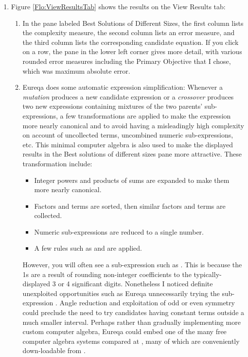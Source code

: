 \documentclass[12pt,english]{article}
\begin{document}
\begin{enumerate}
\begin{enumerate}
\end{enumerate}
\item Figure \ref{Flo:ViewResultsTab} shows the results on the \textsf{View
Results }tab: \vspace{-5pt}


\begin{enumerate}
\item In the pane labeled \textsf{Best Solutions of Different Sizes}, the
first column lists the complexity measure, the second column lists
an error measure, and the third column lists the corresponding candidate
equation. If you click on a row, the pane in the lower left corner
gives more detail, with various rounded error measures including the
\textsf{Primary Objective} that I chose, which was maximum absolute
error.\vspace{-5pt}

\item Eureqa does some automatic expression simplification: Whenever a \textsl{mutation}
produces a new candidate expression or a \textsl{crossover} produces
two new expressions containing mixtures of the two parents' sub-expressions,
a few transformations are applied to make the expression more nearly
canonical and to avoid having a misleadingly high complexity on account
of uncollected terms, uncombined numeric sub-expressions, etc. This
minimal computer algebra is also used to make the displayed results
in the \textsf{Best solutions of different sizes} pane more attractive.
These transformation include:\vspace{-3pt}


\begin{itemize}
\item Integer powers and products of sums are expanded to make them more
nearly canonical.
\item Factors and terms are sorted, then similar factors and terms are collected.
\item Numeric sub-expressions are reduced to a single number.
\item A few rules such as 
and  are applied.
\end{itemize}
However, you will often see a sub-expression such as .
This is because the 1s are a result of rounding non-integer coefficients
to the typically-displayed 3 or 4 significant digits. Nonetheless
I noticed definite unexploited opportunities such as Eureqa unnecessarily
trying the sub-expression . Angle reduction and exploitation
of odd or even symmetry could preclude the need to try candidates
having constant terms outside a much smaller interval. Perhaps rather
than gradually implementing more custom computer algebra, Eureqa could
embed one of the many free computer algebra systems compared at \cite{ComparisonOfCAS},
many of which are conveniently down-loadable from \cite{sourceforgeCAS}.


\end{enumerate}
\end{enumerate}
\end{document}
